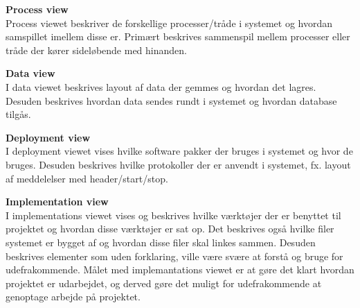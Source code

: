 \textbf{Process view}\\
Process viewet beskriver de forskellige processer/tråde i systemet og hvordan samspillet imellem disse er. Primært beskrives sammenspil mellem processer eller tråde der kører sideløbende med hinanden.

\textbf{Data view}\\
I data viewet beskrives layout af data der gemmes og hvordan det lagres. Desuden beskrives hvordan data sendes rundt i systemet og hvordan database tilgås. 

\textbf{Deployment view}\\
I deployment viewet vises hvilke software pakker der bruges i systemet og hvor de bruges. Desuden beskrives hvilke protokoller der er anvendt i systemet, fx. layout af meddelelser med header/start/stop. 
  

\textbf{Implementation view}\\
I implementations viewet vises og beskrives hvilke værktøjer der er benyttet til projektet og hvordan disse værktøjer er sat op. Det beskrives også hvilke filer systemet er bygget af og hvordan disse filer skal linkes sammen. 
Desuden beskrives elementer som uden forklaring, ville være svære at forstå og bruge for udefrakommende. Målet med implemantations viewet er at gøre det klart hvordan projektet er udarbejdet, og derved gøre det muligt for udefrakommende at genoptage arbejde på projektet.



